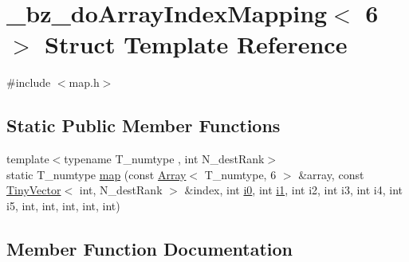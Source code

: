 \hypertarget{struct__bz__doArrayIndexMapping_3_016_01_4}{}\section{\+\_\+bz\+\_\+do\+Array\+Index\+Mapping$<$ 6 $>$ Struct Template Reference}
\label{struct__bz__doArrayIndexMapping_3_016_01_4}


{\ttfamily \#include $<$map.\+h$>$}

\subsection*{Static Public Member Functions}
\begin{DoxyCompactItemize}
\item 
{\footnotesize template$<$typename T\+\_\+numtype , int N\+\_\+dest\+Rank$>$ }\\static T\+\_\+numtype \hyperlink{struct__bz__doArrayIndexMapping_3_016_01_4_a5e4d8feedc5901cd213d2d72d935adcd}{map} (const \hyperlink{classArray}{Array}$<$ T\+\_\+numtype, 6 $>$ \&array, const \hyperlink{classTinyVector}{Tiny\+Vector}$<$ int, N\+\_\+dest\+Rank $>$ \&index, int \hyperlink{cephes_8h_aacd2643d920288e61be16787561a4514}{i0}, int \hyperlink{cephes_8h_ab24474d03df1f9adf1700c2c1badd1a5}{i1}, int i2, int i3, int i4, int i5, int, int, int, int, int)
\end{DoxyCompactItemize}


\subsection{Member Function Documentation}
\hypertarget{struct__bz__doArrayIndexMapping_3_016_01_4_a5e4d8feedc5901cd213d2d72d935adcd}{}
